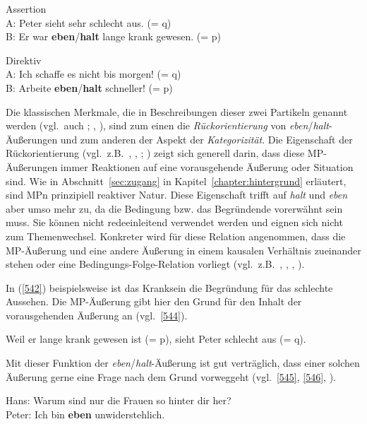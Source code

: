 \begin{exe}
	\ex\label{542} Assertion\\
	A: Peter sieht sehr schlecht aus. (= q)\\
	B: Er war \textbf{eben}\slash\textbf{halt} lange krank gewesen. (= p)		
\end{exe}	

\begin{exe}
	\ex\label{543} Direktiv\\
	A: Ich schaffe es nicht bis morgen! (= q)\\
	B: Arbeite \textbf{eben}\slash\textbf{halt} schneller! (= p)	
	\hfill\hbox{\citet[340/215]{Karagjosova2004}} 	
\end{exe}				    
Die klassischen Merkmale, die in Beschreibungen dieser zwei Partikeln genannt werden (vgl.\ auch \citealt[150--152]{Mueller2016a}; \citeyear[165--169]{Mueller2016b}, \citeyear[239--243]{Mueller2017a}), sind zum einen die \textit{Rückorientierung} von \textit{eben}/\textit{halt}-Äußerungen und zum anderen der Aspekt der \textit{Kategorizität}. Die Eigenschaft der Rückorientierung (vgl.\ z.B.\ \citealt[98, 224]{Dahl1988}, \citealt[120, 125--126]{Thurmair1989}, \citealt[340]{Karagjosova2003}; \citeyear[208]{Karagjosova2004}) zeigt sich generell darin, dass diese MP-Äußerungen immer Reaktionen auf eine vorausgehende Äußerung oder Situation sind. Wie in Abschnitt~\ref{sec:zugang} in Kapitel~\ref{chapter:hintergrund} erläutert, sind MPn prinzipiell reaktiver Natur. Diese Eigenschaft trifft auf \textit{halt} und \textit{eben} aber umso mehr zu, da die Bedingung bzw. das Begründende vorerwähnt sein muss. Sie können nicht redeeinleitend verwendet werden und eignen sich nicht zum Themenwechsel. Konkreter wird für diese Relation angenommen, dass die MP-Äußerung und eine andere Äußerung in einem kausalen Verhältnis  zueinander stehen oder eine Bedingungs-Folge-Relation  vorliegt (vgl.\ z.B.\ \citealt[40]{Weydt1969}, \citealt[101, 288]{Dahl1988}, \citeyear[Fn 60, 125]{Dahl1988} \citealt[121]{Helbig1990}, \citealt[67]{Koenig1997}). 

In (\ref{542}) beispielsweise ist das Kranksein die Begründung für das schlechte Aussehen. Die MP-Äußerung gibt hier den Grund für den Inhalt der vorausgehenden Äußerung an (vgl.\ \ref{544}).

\begin{exe}
	\ex\label{544} Weil er lange krank gewesen ist (= p), sieht Peter schlecht aus (= q).		
\end{exe}
Mit dieser Funktion der \textit{eben}/\textit{halt}-Äußerung ist gut verträglich, dass einer solchen Äußerung gerne eine Frage nach dem Grund vorweggeht (vgl.\ \ref{545}, \ref{546}, \citealt[121]{Thurmair1989}).
\begin{exe}
	\ex\label{545} 
	Hans: Warum sind nur die Frauen so hinter dir her?\\
	Peter: Ich bin \textbf{eben} unwiderstehlich.
	\hfill\hbox{\citet[121]{Thurmair1989}} 	
\end{exe}	

